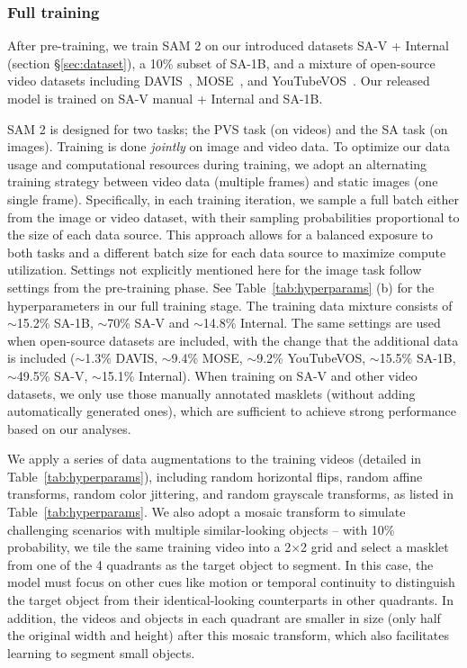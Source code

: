 \documentclass[]{fairmeta}
\newcommand{\secref}[1]{\S\ref{#1}}
\newcommand{\tabref}[1]{Table~\ref{#1}}
\begin{document}
\subsubsection{Full training}
\label{app:savi_model_fulltraining}

After pre-training, we train SAM 2 on our introduced datasets SA-V + Internal (section \secref{sec:dataset}), a 10\% subset of SA-1B, and a mixture of open-source video datasets including DAVIS~\citep{Pont-Tuset_arXiv_2017, caelles20192019}, MOSE~\citep{Ding2023MOSEAN}, and YouTubeVOS~\citep{Xu2018YouTubeVOSAL}. 
Our released model is trained on SA-V manual + Internal and SA-1B. 

SAM 2 is designed for two tasks; the PVS task (on videos) and the SA task (on images). 
Training is done \textit{jointly} on image and video data. To optimize our data usage and computational resources during training, we adopt an alternating training strategy between video data (multiple frames) and static images (one single frame). Specifically, in each training iteration, we sample a full batch either from the image or video dataset, with their sampling probabilities proportional to the size of each data source. This approach allows for a balanced exposure to both tasks and a different batch size for each data source to maximize compute utilization. Settings not explicitly mentioned here for the image task follow settings from the pre-training phase. See \tabref{tab:hyperparams} (b) for the hyperparameters in our full training stage. The training data mixture consists of $\sim$15.2\% SA-1B, $\sim$70\% SA-V and $\sim$14.8\% Internal. The same settings are used when open-source datasets are included, with the change that the additional data is included ($\sim$1.3\% DAVIS, $\sim$9.4\% MOSE, $\sim$9.2\% YouTubeVOS, $\sim$15.5\% SA-1B, $\sim$49.5\% SA-V, $\sim$15.1\% Internal). When training on SA-V and other video datasets, we only use those manually annotated masklets (without adding automatically generated ones), which are sufficient to achieve strong performance based on our analyses.

We apply a series of data augmentations to the training videos (detailed in \tabref{tab:hyperparams}), including random horizontal flips, random affine transforms, random color jittering, and random grayscale transforms, as listed in \tabref{tab:hyperparams}. We also adopt a mosaic transform to simulate challenging scenarios with multiple similar-looking objects -- with 10\% probability, we tile the same training video into a 2$\times$2 grid and select a masklet from one of the 4 quadrants as the target object to segment. In this case, the model must focus on other cues like motion or temporal continuity to distinguish the target object from their identical-looking counterparts in other quadrants. In addition, the videos and objects in each quadrant are smaller in size (only half the original width and height) after this mosaic transform, which also facilitates learning to segment small objects.
\end{document}
